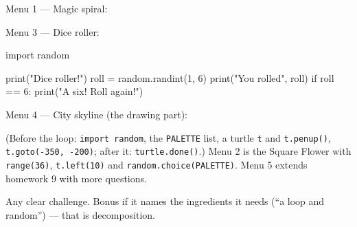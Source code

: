 \begin{answer}
Menu 1 --- Magic spiral:
Menu 3 --- Dice roller:
\begin{pycode}
import random

print("Dice roller!")
roll = random.randint(1, 6)
print("You rolled", roll)
if roll == 6:
    print("A six! Roll again!")
\end{pycode}
Menu 4 --- City skyline (the drawing part):
(Before the loop: \texttt{import random}, the \texttt{PALETTE} list, a turtle \texttt{t} and \texttt{t.penup()}, \texttt{t.goto(-350, -200)}; after it: \texttt{turtle.done()}.) Menu 2 is the Square Flower with \texttt{range(36)}, \texttt{t.left(10)} and \texttt{random.choice(PALETTE)}. Menu 5 extends homework 9 with more questions.
\end{answer}

\begin{answer}
Any clear challenge. Bonus if it names the ingredients it needs (\enquote{a loop and random}) --- that is decomposition.
\end{answer}
